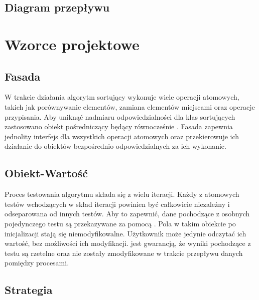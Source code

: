 \subsection{Diagram przepływu}

\section{Wzorce projektowe}

\subsection{Fasada}
W trakcie działania algorytm sortujący wykonuje wiele operacji atomowych, takich jak porównywanie
elementów, zamiana elementów miejscami oraz operacje przypisania. Aby uniknąć nadmiaru odpowiedzialności
dla klas sortujących zastosowano obiekt pośredniczący  będący równocześnie .
Fasada zapewnia jednolity interfejs dla wszystkich operacji atomowych oraz przekierowuje ich działanie
do obiektów bezpośrednio odpowiedzialnych za ich wykonanie.

\begin{figure}[H]
	\centering
	
\end{figure}

\subsection{Obiekt-Wartość}
Proces testowania algorytmu składa się z wielu iteracji. Każdy z atomowych testów wchodzących w skład
iteracji powinien być całkowicie niezależny i odseparowana od innych testów. Aby to zapewnić, dane pochodzące
z osobnych pojedynczego testu są przekazywane za pomocą . Pola w takim obiekcie po
inicjalizacji stają się niemodyfikowalne. Użytkownik może jedynie odczytać ich wartość, bez możliwości ich modyfikacji.  jest gwarancją, że wyniki pochodzące z testu są rzetelne oraz nie zostały
zmodyfikowane w trakcie przepływu danych pomiędzy procesami.

\begin{figure}[H]
	\centering
	
\end{figure}

\subsection{Strategia}


